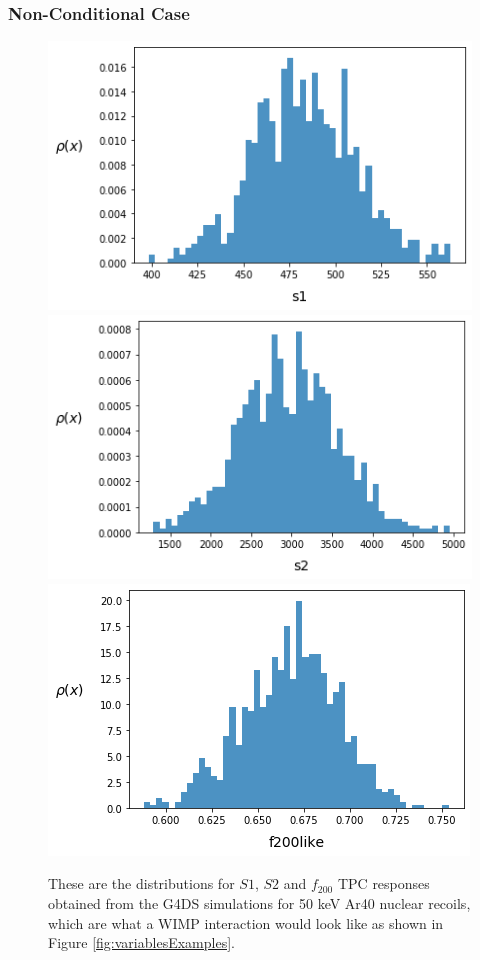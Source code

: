 \documentclass[11pt]{article} %
\begin{document}
\subsubsection{Non-Conditional Case}
\begin{figure}[H]
\centering
\includegraphics[scale=0.4]{images/1d_s1_simulation.png}
\includegraphics[scale=0.4]{images/1d_s2_simulation.png}
\includegraphics[scale=0.4]{images/1d_f200_simulation.png}
\caption{These are the distributions for $S1$, $S2$ and $f_{200}$ TPC responses obtained from the G4DS simulations for 50 keV Ar40 nuclear recoils, which are what a WIMP interaction would look like as shown in Figure \ref{fig:variablesExamples}. }
\label{fig:1DG4DS}
\end{figure}
\end{document}

